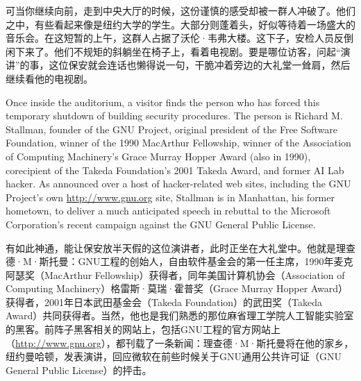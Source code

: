 \ifdefined\chs
可当你继续向前，走到中央大厅的时候，这份谨慎的感受却被一群人冲破了。他们之中，有些看起来像是纽约大学的学生。大部分则蓬着头，好似等待着一场盛大的音乐会。在这短暂的上午，这群人占据了沃伦·韦弗大楼。这下子，安检人员反倒闲下来了。他们不规矩的斜躺坐在椅子上，看着电视剧。要是哪位访客，问起“演讲”的事，这位保安就会连话也懒得说一句，干脆冲着旁边的大礼堂一耸肩，然后继续看他的电视剧。
\fi

\ifdefined\eng
Once inside the auditorium, a visitor finds the person who has forced this temporary shutdown of building security procedures. The person is Richard M. Stallman, founder of the GNU Project, original president of the Free Software Foundation, winner of the 1990 MacArthur Fellowship, winner of the Association of Computing Machinery's Grace Murray Hopper Award (also in 1990), corecipient of the Takeda Foundation's 2001 Takeda Award, and former AI Lab hacker. As announced over a host of hacker-related web sites, including the GNU Project's own \url{http://www.gnu.org} site, Stallman is in Manhattan, his former hometown, to deliver a much anticipated speech in rebuttal to the Microsoft Corporation's recent campaign against the GNU General Public License.
\fi

\ifdefined\chs
有如此神通，能让保安放半天假的这位演讲者，此时正坐在大礼堂中。他就是理查德·M·斯托曼：GNU工程的创始人，自由软件基金会的第一任主席，1990年麦克阿瑟奖（MacArthur Fellowship）获得者，同年美国计算机协会（Association of Computing Machinery）格雷斯·莫瑞·霍普奖（Grace Murray Hopper Award）获得者，2001年日本武田基金会（Takeda Foundation）的武田奖（Takeda Award）共同获得者。当然，他也是我们熟悉的那位麻省理工学院人工智能实验室的黑客。前阵子黑客相关的网站上，包括GNU工程的官方网站上（\url{http://www.gnu.org}），都刊载了一条新闻：理查德·M·斯托曼将在他的家乡，纽约曼哈顿，发表演讲，回应微软在前些时候关于GNU通用公共许可证（GNU General Public License）的抨击。
\fi

